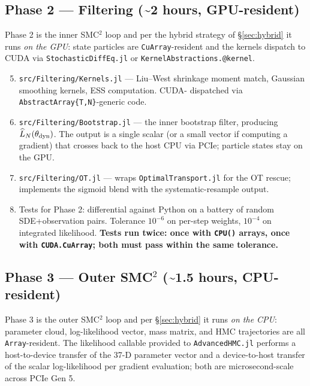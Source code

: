 \documentclass[11pt,a4paper]{article}
\begin{document}
\subsection{Phase 2 --- Filtering (\textasciitilde 2 hours, GPU-resident)}

Phase 2 is the inner SMC$^2$ loop and per the hybrid strategy of
§\ref{sec:hybrid} it runs \emph{on the GPU}: state particles are
\texttt{CuArray}-resident and the kernels dispatch to CUDA via
\texttt{StochasticDiffEq.jl} or \texttt{KernelAbstractions.@kernel}.

\begin{enumerate}\setcounter{enumi}{4}
\item \texttt{src/Filtering/Kernels.jl} --- Liu--West shrinkage
  moment match, Gaussian smoothing kernels, ESS computation. CUDA-
  dispatched via \texttt{AbstractArray\{T,N\}}-generic code.
\item \texttt{src/Filtering/Bootstrap.jl} --- the inner bootstrap
  filter, producing $\widehat{L}_N(\theta_{\rm dyn})$. The output
  is a single scalar (or a small vector if computing a gradient)
  that crosses back to the host CPU via PCIe; particle states
  stay on the GPU.
\item \texttt{src/Filtering/OT.jl} --- wraps
  \texttt{OptimalTransport.jl} for the OT rescue; implements the
  sigmoid blend with the systematic-resample output.
\item Tests for Phase 2: differential against Python on a battery
  of random SDE+observation pairs. Tolerance $10^{-6}$ on per-step
  weights, $10^{-4}$ on integrated likelihood. \textbf{Tests run
  twice: once with \texttt{CPU()} arrays, once with
  \texttt{CUDA.CuArray}; both must pass within the same
  tolerance.}
\end{enumerate}

\subsection{Phase 3 --- Outer SMC$^2$ (\textasciitilde 1.5 hours, CPU-resident)}

Phase 3 is the outer SMC$^2$ loop and per §\ref{sec:hybrid} it
runs \emph{on the CPU}: parameter cloud, log-likelihood vector,
mass matrix, and HMC trajectories are all
\texttt{Array}-resident. The likelihood callable provided to
\texttt{AdvancedHMC.jl} performs a host-to-device transfer of
the 37-D parameter vector and a device-to-host transfer of the
scalar log-likelihood per gradient evaluation; both are
microsecond-scale across PCIe Gen 5.
\end{document}
